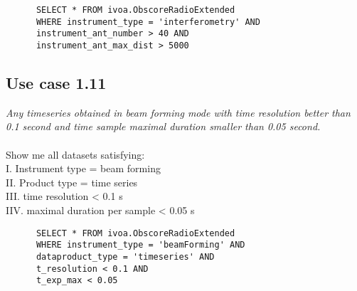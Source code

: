 \documentclass[11pt,a4paper]{ivoa}
\begin{document}
\begin{verbatim}
      SELECT * FROM ivoa.ObscoreRadioExtended
      WHERE instrument_type = 'interferometry' AND
      instrument_ant_number > 40 AND
      instrument_ant_max_dist > 5000 
\end{verbatim}


\subsection{Use case 1.11}
\textit{Any timeseries obtained in beam forming mode with time resolution better than 0.1 second and time sample maximal duration smaller than 0.05 second. }\\ \\
Show me all datasets satisfying:\\
I. Instrument type = beam forming\\
II. Product type = time series  \\
III. time resolution < 0.1 s\\
IIV. maximal duration per sample  < 0.05 s \\

\begin{verbatim}
      SELECT * FROM ivoa.ObscoreRadioExtended
      WHERE instrument_type = 'beamForming' AND
      dataproduct_type = 'timeseries' AND
      t_resolution < 0.1 AND
      t_exp_max < 0.05 
\end{verbatim}

\end{document}
